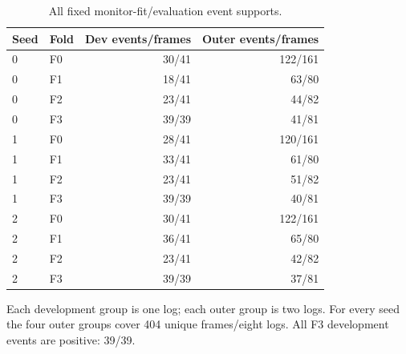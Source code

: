 \begin{table}[t]
\centering\footnotesize
\caption{All fixed monitor-fit/evaluation event supports.}\label{tab:support}
\setlength{\tabcolsep}{3pt}
\begin{tabular}{llrr}\toprule
Seed & Fold & Dev events/frames & Outer events/frames\\\midrule
0 & F0 & 30/41 & 122/161\\
0 & F1 & 18/41 & 63/80\\
0 & F2 & 23/41 & 44/82\\
0 & F3 & 39/39 & 41/81\\
1 & F0 & 28/41 & 120/161\\
1 & F1 & 33/41 & 61/80\\
1 & F2 & 23/41 & 51/82\\
1 & F3 & 39/39 & 40/81\\
2 & F0 & 30/41 & 122/161\\
2 & F1 & 36/41 & 65/80\\
2 & F2 & 23/41 & 42/82\\
2 & F3 & 39/39 & 37/81\\
\bottomrule\end{tabular}
\par\vspace{3pt}\begin{minipage}{0.98\columnwidth}\footnotesize Each development group is one log; each outer group is two logs. For every seed the four outer groups cover 404 unique frames/eight logs. All F3 development events are positive: 39/39.\end{minipage}
\end{table}
